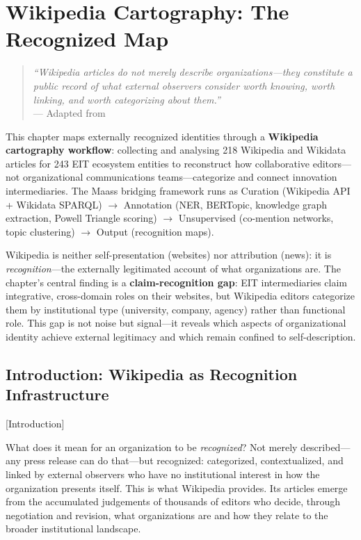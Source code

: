 \documentclass[../main.tex]{subfiles}
\begin{document}
\chapter{Wikipedia Cartography: The Recognized Map}
\margintoc

\begin{quote}
\textit{``Wikipedia articles do not merely describe organizations---they constitute a public record of what external observers consider worth knowing, worth linking, and worth categorizing about them.''}\\
--- Adapted from \textcite{kittur2009crowds}
\end{quote}

\begin{chapteroverview}
This chapter maps externally recognized identities through a \textbf{Wikipedia cartography workflow}: collecting and analysing 218 Wikipedia and Wikidata articles for 243 EIT ecosystem entities to reconstruct how collaborative editors---not organizational communications teams---categorize and connect innovation intermediaries. The Maass bridging framework runs as Curation (Wikipedia API + Wikidata SPARQL) $\rightarrow$ Annotation (NER, BERTopic, knowledge graph extraction, Powell Triangle scoring) $\rightarrow$ Unsupervised (co-mention networks, topic clustering) $\rightarrow$ Output (recognition maps).

Wikipedia is neither self-presentation (websites) nor attribution (news): it is \emph{recognition}---the externally legitimated account of what organizations are. The chapter's central finding is a \textbf{claim-recognition gap}: EIT intermediaries claim integrative, cross-domain roles on their websites, but Wikipedia editors categorize them by institutional type (university, company, agency) rather than functional role. This gap is not noise but signal---it reveals which aspects of organizational identity achieve external legitimacy and which remain confined to self-description.
\end{chapteroverview}


\section{Introduction: Wikipedia as Recognition Infrastructure}[Introduction]

What does it mean for an organization to be \emph{recognized}? Not merely described---any press release can do that---but recognized: categorized, contextualized, and linked by external observers who have no institutional interest in how the organization presents itself. This is what Wikipedia provides. Its articles emerge from the accumulated judgements of thousands of editors who decide, through negotiation and revision, what organizations are and how they relate to the broader institutional landscape.
\end{document}
